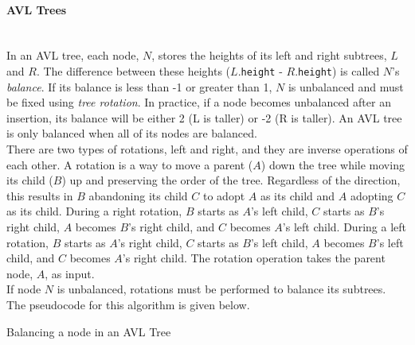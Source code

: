 \paragraph{AVL Trees} \hspace*{1mm} \vspace*{2mm} \\

In an AVL tree, each node, $N$, stores the heights of its left and right subtrees, $L$ and $R$. The difference between these heights ($L$.\texttt{height} - $R$.\texttt{height}) is called $N$'s \textit{balance}. If its balance is less than -1 or greater than 1, $N$ is unbalanced and must be fixed using \textit{tree rotation}. In practice, if a node becomes unbalanced after an insertion, its balance will be either 2 (L is taller) or -2 (R is taller). An AVL tree is only balanced when all of its nodes are balanced. \\

There are two types of rotations, left and right, and they are inverse operations of each other. A rotation is a way to move a parent ($A$) down the tree while moving its child ($B$) up and preserving the order of the tree. Regardless of the direction, this results in $B$ abandoning its child $C$ to adopt $A$ as its child and $A$ adopting $C$ as its child. During a right rotation, $B$ starts as $A$'s left child, $C$ starts as $B$'s right child, $A$ becomes $B$'s right child, and $C$ becomes $A$'s left child. During a left rotation, $B$ starts as $A$'s right child, $C$ starts as $B$'s left child, $A$ becomes $B$'s left child, and $C$ becomes $A$'s right child. The rotation operation takes the parent node, $A$, as input.\\

If node $N$ is unbalanced, rotations must be performed to balance its subtrees. The pseudocode for this algorithm is given below. \\

\begin{algorithm}[H]
	\caption{Balancing a node in an AVL Tree}
\end{algorithm}
\vspace{5mm}

